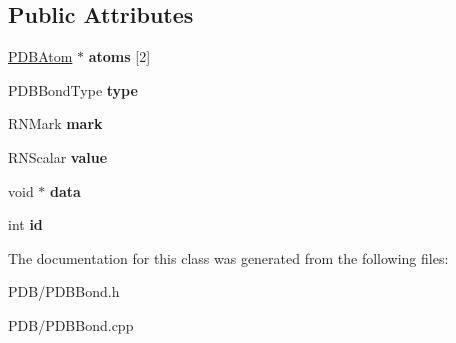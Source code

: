 \subsection*{Public Attributes}
\begin{DoxyCompactItemize}
\item 
\hyperlink{class_p_d_b_atom}{P\+D\+B\+Atom} $\ast$ {\bfseries atoms} \mbox{[}2\mbox{]}\hypertarget{class_p_d_b_bond_a6cdefa3e6f727a01b66e7c0756bb16f6}{}\label{class_p_d_b_bond_a6cdefa3e6f727a01b66e7c0756bb16f6}

\item 
P\+D\+B\+Bond\+Type {\bfseries type}\hypertarget{class_p_d_b_bond_ab21da23f3285b28eeaea84c70a5b2ccc}{}\label{class_p_d_b_bond_ab21da23f3285b28eeaea84c70a5b2ccc}

\item 
R\+N\+Mark {\bfseries mark}\hypertarget{class_p_d_b_bond_ac541fc7c20c1a0d7bdd88d21a936c6ef}{}\label{class_p_d_b_bond_ac541fc7c20c1a0d7bdd88d21a936c6ef}

\item 
R\+N\+Scalar {\bfseries value}\hypertarget{class_p_d_b_bond_a9ecdc420587952c98c25e32ce7f9d332}{}\label{class_p_d_b_bond_a9ecdc420587952c98c25e32ce7f9d332}

\item 
void $\ast$ {\bfseries data}\hypertarget{class_p_d_b_bond_ad85603ca8ecbff28eff92c9a9da4c2b7}{}\label{class_p_d_b_bond_ad85603ca8ecbff28eff92c9a9da4c2b7}

\item 
int {\bfseries id}\hypertarget{class_p_d_b_bond_a083b46e8c51d97b38b58d783d4ad9147}{}\label{class_p_d_b_bond_a083b46e8c51d97b38b58d783d4ad9147}

\end{DoxyCompactItemize}


The documentation for this class was generated from the following files\+:\begin{DoxyCompactItemize}
\item 
P\+D\+B/P\+D\+B\+Bond.\+h\item 
P\+D\+B/P\+D\+B\+Bond.\+cpp\end{DoxyCompactItemize}
